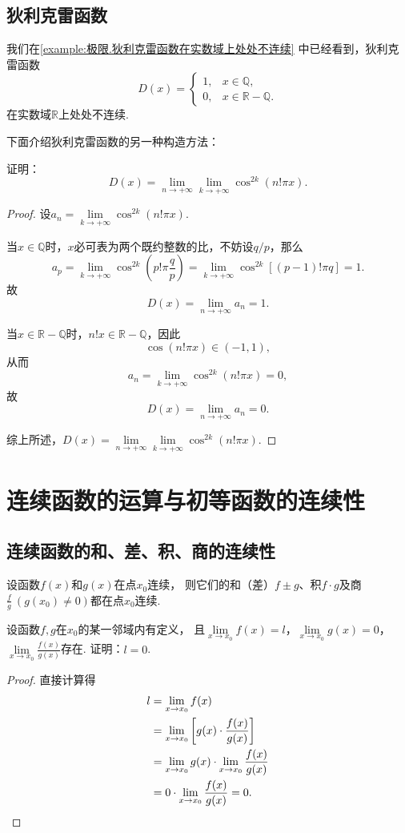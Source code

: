 \subsection{狄利克雷函数}
我们在\cref{example:极限.狄利克雷函数在实数域上处处不连续} 中已经看到，狄利克雷函数\[
D(x) = \left\{ \begin{array}{ll}
1, & x \in \mathbb{Q}, \\
0, & x \in \mathbb{R} - \mathbb{Q}.
\end{array} \right.
\]在实数域\(\mathbb{R}\)上处处不连续.

下面介绍狄利克雷函数的另一种构造方法：
\begin{example}
证明：\[
D(x) = \lim\limits_{n\to+\infty} \lim\limits_{k\to+\infty} \cos^{2k}(n! \pi x).
\]
\begin{proof}
设\(a_n = \lim\limits_{k\to+\infty} \cos^{2k}(n! \pi x)\).

当\(x \in \mathbb{Q}\)时，\(x\)必可表为两个既约整数的比，不妨设\(q/p\)，那么\[
a_p = \lim\limits_{k\to+\infty} \cos^{2k}\left(p! \pi \frac{q}{p}\right)
= \lim\limits_{k\to+\infty} \cos^{2k}[(p-1)! \pi q] = 1.
\]故\[
D(x) = \lim\limits_{n\to+\infty} a_n = 1.
\]

当\(x \in \mathbb{R}-\mathbb{Q}\)时，\(n! x \in \mathbb{R}-\mathbb{Q}\)，因此\[
\cos(n! \pi x) \in (-1,1),
\]从而\[
a_n = \lim\limits_{k\to+\infty} \cos^{2k}(n! \pi x) = 0,
\]故\[
D(x) = \lim\limits_{n\to+\infty} a_n = 0.
\]

综上所述，\(D(x) = \lim\limits_{n\to+\infty} \lim\limits_{k\to+\infty} \cos^{2k}(n! \pi x)\).
\end{proof}
\end{example}

\section{连续函数的运算与初等函数的连续性}
\subsection{连续函数的和、差、积、商的连续性}
\begin{theorem}\label{theorem:极限.连续函数的极限1}
设函数\(f(x)\)和\(g(x)\)在点\(x_0\)连续，
则它们的和（差）\(f \pm g\)、积\(f \cdot g\)及商\(\frac{f}{g}\ (g(x_0)\neq0)\)都在点\(x_0\)连续.
\end{theorem}

\begin{example}
设函数\(f,g\)在\(x_0\)的某一邻域内有定义，
\def\l{\lim\limits_{x\to x_0}}%
且\(\l f(x)=l\)，\(\l g(x)=0\)，\(\l \frac{f(x)}{g(x)}\)存在.
证明：\(l=0\).
\begin{proof}
直接计算得
\begin{align*}
	l &= \l f(x) \\
	&= \l \left[
		g(x) \cdot \frac{f(x)}{g(x)}
	\right] \\
	&= \l g(x) \cdot \l \frac{f(x)}{g(x)} \\
	&= 0 \cdot \l \frac{f(x)}{g(x)} = 0.
	\qedhere
\end{align*}
\end{proof}
\end{example}

